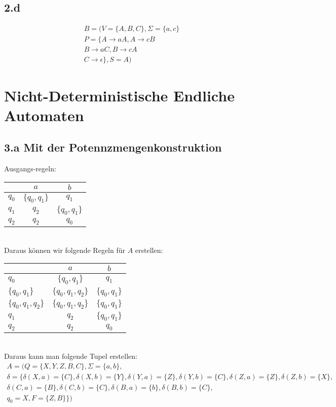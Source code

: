 \documentclass[10pt,ngerman]{scrartcl}
\begin{document}
\subsection{2.d}
\begin{align*}
 B=(V=\{A,B,C\},\Sigma=\{a,c\}\\
 P=\{A \longrightarrow aA, A \longrightarrow cB\\
 B \longrightarrow aC,B \longrightarrow cA\\
 C \longrightarrow \epsilon\},S=A)
\end{align*}
\pagebreak
\section{Nicht-Deterministische Endliche Automaten}
\subsection{3.a Mit der Potennzmengenkonstruktion}
Ausgangs-regeln:
\begin{table}[h]
\begin{center}
 \begin{tabular}{l|c|c}
& $a$ & $b$\\
\hline
$q_0$ & $\{q_0,q_1\}$ & $q_1$ \\
\hline
$q_1$ & $q_2$ & $\{q_0,q_1\}$ \\
\hline
$q_2$ & $q_2$ & $q_0$ \\
 \end{tabular}
\end{center}
\end{table}\\
Daraus können wir folgende Regeln für $A$ erstellen:
\begin{table}[h]
\begin{center}
 \begin{tabular}{l|c|c}
& $a$ & $b$\\
\hline
$q_0$ & $\{q_0,q_1\}$ & $q_1$ \\
\hline
$\{q_0,q_1\}$ & $\{q_0,q_1,q_2\}$ & $\{q_0,q_1\}$ \\
\hline
$\{q_0,q_1,q_2\}$ & $\{q_0,q_1,q_2\}$ & $\{q_0,q_1\}$ \\
\hline
$q_1$ & $q_2$ & $\{q_0,q_1\}$ \\
\hline
$q_2$ & $q_2$ & $q_0$
 \end{tabular}
\end{center}
\end{table}\\
Daraus kann man folgende Tupel erstellen:
\begin{align*}
 A=(Q=\{X,Y,Z,B,C\},\Sigma=\{a,b\},\\ \delta = \{ \delta(X,a) = \{C\},\delta(X,b) = \{Y\},\delta(Y,a) = \{Z\},\delta(Y,b) = \{C\},\delta(Z,a) = \{Z\},\delta(Z,b) = \{X\},\\ \delta(C,a) = \{B\},\delta(C,b) = \{C\},\delta(B,a) = \{b\},\delta(B,b) = \{C\},\\
 q_0 = X , F = \{Z,B\} \})
\end{align*}
\pagebreak
\end{document}
